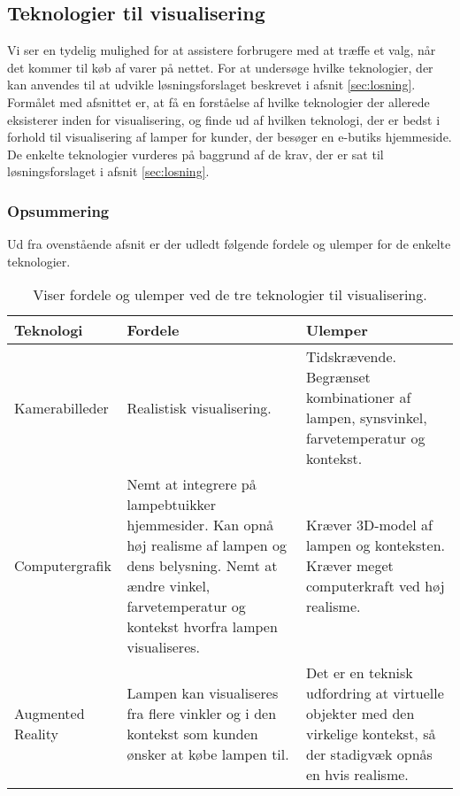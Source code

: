 \subsection{Teknologier til visualisering}
\label{sec:tek_til_visualisering}
Vi ser en tydelig mulighed for at assistere forbrugere med at træffe et valg, når det kommer til køb af varer på nettet. For at undersøge hvilke teknologier, der kan anvendes til at udvikle løsningsforslaget beskrevet i afsnit \ref{sec:losning}. Formålet med afsnittet er, at få en forståelse af hvilke teknologier der allerede eksisterer inden for visualisering, og finde ud af hvilken teknologi, der er bedst i forhold til visualisering af lamper for kunder, der besøger en e-butiks hjemmeside. De enkelte teknologier vurderes på baggrund af de krav, der er sat til løsningsforslaget i afsnit \ref{sec:losning}.







\subsubsection*{Opsummering}
Ud fra ovenstående afsnit er der udledt følgende fordele og ulemper for de enkelte teknologier.
\begin{table}[H]
  \centering
  
\center
    \begin{tabular}{ | p{3cm} | p{5cm} | p{5cm} |}
    
    \hline
    Teknologi & Fordele & Ulemper \\ \hline
    Kamerabilleder & Realistisk visualisering. & Tidskrævende. Begrænset kombinationer af lampen, synsvinkel, farvetemperatur og kontekst. \\ \hline
   Computergrafik & Nemt at integrere på lampebtuikker hjemmesider. Kan opnå høj realisme af lampen og dens belysning. \newline Nemt at ændre vinkel, farvetemperatur og kontekst hvorfra lampen visualiseres. & Kræver 3D-model af lampen og konteksten. Kræver meget computerkraft ved høj realisme. \\ \hline
   Augmented Reality & Lampen kan visualiseres fra flere vinkler og i den kontekst som kunden ønsker at købe lampen til. & Det er en teknisk udfordring at virtuelle objekter med den virkelige kontekst, så der stadigvæk opnås en hvis realisme. \\ \hline
    \end{tabular}
  \caption{Viser fordele og ulemper ved de tre teknologier til visualisering.}
\label{tab:fordele_ulemper_teknologier}
\end{table}

